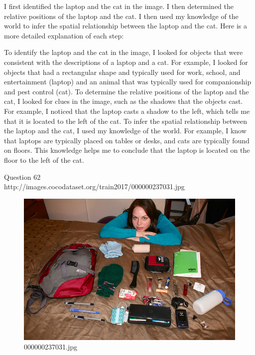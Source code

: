 \begin{enumerate}
    I first identified the laptop and the cat in the image.
    I then determined the relative positions of the laptop and the cat.
    I then used my knowledge of the world to infer the spatial relationship between the laptop and the cat.
    Here is a more detailed explanation of each step:
    
    To identify the laptop and the cat in the image, I looked for objects that were consistent with the descriptions of a laptop and a cat. For example, I looked for objects that had a rectangular shape and typically used for work, school, and entertainment (laptop) and an animal that was typically used for companionship and pest control (cat).
    To determine the relative positions of the laptop and the cat, I looked for clues in the image, such as the shadows that the objects cast. For example, I noticed that the laptop casts a shadow to the left, which tells me that it is located to the left of the cat.
    To infer the spatial relationship between the laptop and the cat, I used my knowledge of the world. For example, I know that laptops are typically placed on tables or desks, and cats are typically found on floors. This knowledge helps me to conclude that the laptop is located on the floor to the left of the cat.
\end{enumerate}
Question 62\\
http://images.cocodataset.org/train2017/000000237031.jpg
\begin{figure}[h]
    \centering
    \includegraphics[width=0.8\linewidth]{../image set/hard/000000237031.jpg}
    \caption{000000237031.jpg}
\end{figure}

